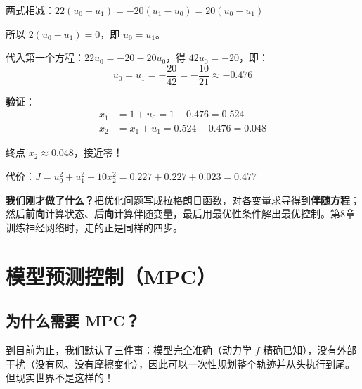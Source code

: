 两式相减：$22(u_0 - u_1) = -20(u_1 - u_0) = 20(u_0 - u_1)$

所以 $2(u_0 - u_1) = 0$，即 $u_0 = u_1$。

代入第一个方程：$22u_0 = -20 - 20u_0$，得 $42u_0 = -20$，即：
\[
u_0 = u_1 = -\frac{20}{42} = -\frac{10}{21} \approx -0.476
\]

\textbf{验证}：
\begin{align}
x_1 &= 1 + u_0 = 1 - 0.476 = 0.524 \\
x_2 &= x_1 + u_1 = 0.524 - 0.476 = 0.048
\end{align}

终点 $x_2 \approx 0.048$，接近零！

代价：$J = u_0^2 + u_1^2 + 10x_2^2 = 0.227 + 0.227 + 0.023 = 0.477$

\begin{insightbox}
\textbf{我们刚才做了什么？}把优化问题写成拉格朗日函数，对各变量求导得到\textbf{伴随方程}；然后\textbf{前向}计算状态、\textbf{后向}计算伴随变量，最后用最优性条件解出最优控制。第8章训练神经网络时，走的正是同样的四步。
\end{insightbox}


\section{模型预测控制（MPC）}

\subsection{为什么需要 MPC？}

到目前为止，我们默认了三件事：模型完全准确（动力学 $f$ 精确已知），没有外部干扰（没有风、没有摩擦变化），因此可以一次性规划整个轨迹并从头执行到尾。但现实世界不是这样的！

